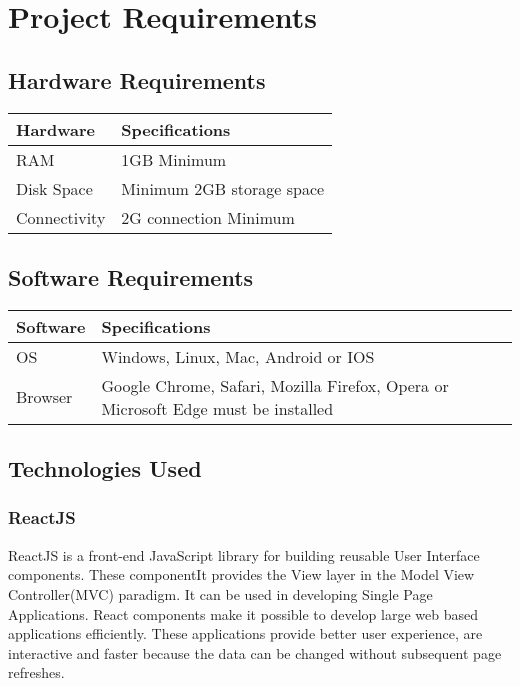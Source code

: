\chapter{Project Requirements}
\section{Hardware Requirements}
\begin{table}[H]
\normalsize
\begin{center}
\begin{tabular}{|m{2.5cm}| m{7cm}|}
	\hline
	\textbf{Hardware} & \textbf{Specifications}\\
	\hline
	RAM  & 1GB Minimum \\
	\hline
Disk Space & Minimum 2GB storage space\\
	\hline
Connectivity & 2G connection Minimum\\
	\hline
\end{tabular}
\end{center}
\end{table}

\section{Software Requirements}
\begin{table}[H]
\normalsize
\begin{center}
\begin{tabular}{|m{2.5cm}| m{8cm}|}
	\hline
	\textbf{Software} & \textbf{Specifications}\\
	\hline
OS & Windows, Linux, Mac, Android or IOS\\
	\hline
Browser & Google Chrome, Safari, Mozilla Firefox, Opera or Microsoft Edge must be installed\\
	\hline
\end{tabular}
\end{center}
\end{table}

\section{Technologies Used}

\subsection{ReactJS}
ReactJS is a front-end JavaScript library for building reusable User Interface components.  These componentIt provides the View layer in the Model View Controller(MVC) paradigm. It can be used in developing Single Page Applications. React components make it possible to develop large web based applications efficiently. These applications provide better user experience, are interactive and faster because the data can be changed without subsequent page refreshes. 


